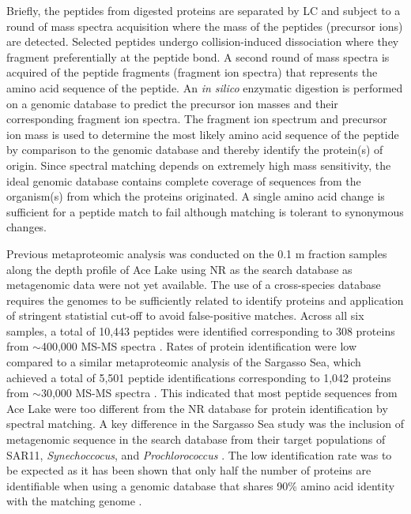 Briefly, the peptides from digested proteins are separated by \ac{LC} and subject to a round of mass spectra acquisition where the mass of the peptides (precursor ions) are detected.
Selected peptides undergo collision-induced dissociation where they fragment preferentially at the peptide bond.
A second round of mass spectra is acquired of the peptide fragments (fragment ion spectra) that represents the amino acid sequence of the peptide.
An \emph{in silico} enzymatic digestion is performed on a genomic database to predict the precursor ion masses and their corresponding fragment ion spectra.
The fragment ion spectrum and precursor ion mass is used to determine the most likely amino acid sequence of the peptide by comparison to the genomic database and thereby identify the protein(s) of origin.
Since spectral matching depends on extremely high mass sensitivity, the ideal genomic database contains complete coverage of sequences from the organism(s) from which the proteins originated. 
A single amino acid change is sufficient for a peptide match to fail although matching is tolerant to synonymous changes.

Previous metaproteomic analysis was conducted on the 0.1 \textmu{}m fraction samples along the depth profile of Ace Lake using \ac{NR} as the search database \cite{Ng2010b} as metagenomic data were not yet available.
The use of a cross-species database requires the genomes to be sufficiently related to identify proteins and application of stringent statistial cut-off to avoid false-positive matches.
Across all six samples, a total of 10,443 peptides were identified corresponding to 308 proteins from $\sim$400,000 \ac{MS-MS} spectra \cite{Ng2010b}.
Rates of protein identification were low compared to a similar metaproteomic analysis of the Sargasso Sea, which achieved  a total of 5,501 peptide identifications corresponding to 1,042 proteins from $\sim$30,000 \ac{MS-MS} spectra \cite{Sowell2009}. 
This indicated that most peptide sequences from Ace Lake were too different from the \ac{NR} database for protein identification by spectral matching.
A key difference in the Sargasso Sea study was the inclusion of metagenomic sequence in the search database from their target populations of SAR11, \emph{Synechoccocus}, and \emph{Prochlorococcus} \cite{Sowell2009}.
The low identification rate was to be expected as it has been shown that only half the number of proteins are identifiable when using a genomic database that shares 90\% amino acid identity with the matching genome \cite{Denef2007}.

